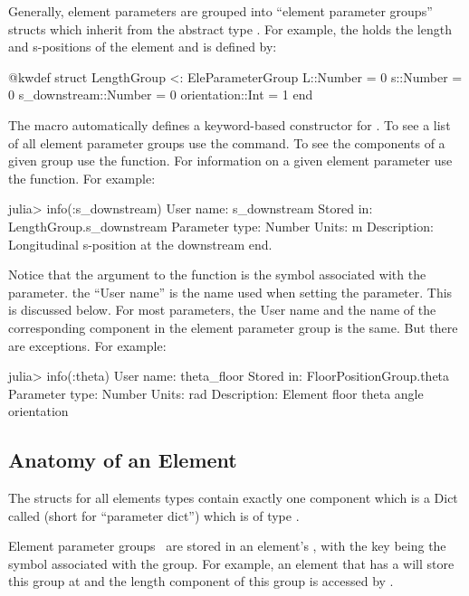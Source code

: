 Generally, element parameters are grouped into ``element parameter groups'' structs which inherit
from the abstract type .
For example, the  holds the length and s-positions of the element and is defined by:
\begin{example}
  @kwdef struct LengthGroup <: EleParameterGroup
    L::Number = 0
    s::Number = 0
    s_downstream::Number = 0
    orientation::Int = 1
  end
\end{example}
The \vn{\@kwdef} macro automatically defines a keyword-based constructor for . 
To see a list of all element parameter groups use the  command.
To see the components of a given group use the  function. For information on
a given element parameter use the  function. For example:
\begin{example}
  julia> info(:s_downstream)
    User name:       s_downstream
    Stored in:       LengthGroup.s_downstream
    Parameter type:  Number
    Units:           m
    Description:     Longitudinal s-position at the downstream end.
\end{example}
Notice that the argument to the  function is the symbol associated with the parameter.
the ``User name'' is the name used when setting the parameter. This is discussed below. For most
parameters, the User name and the name of the corresponding component in the element parameter
group is the same. But there are exceptions. For example:
\begin{example}
  julia> info(:theta)
    User name:       theta_floor
    Stored in:       FloorPositionGroup.theta
    Parameter type:  Number
    Units:           rad
    Description:     Element floor theta angle orientation
\end{example}

\subsection{Anatomy of an Element}
\label{s:ele.anatomy}

The structs for all elements types contain exactly one component which is a Dict called 
(short for ``parameter dict'') which is of type .

Element parameter groups~ are stored in an element's , with the key 
being the symbol associated with the group. For example, an element  that has a
 will store this group at  and the length component 
of this group is accessed by .

